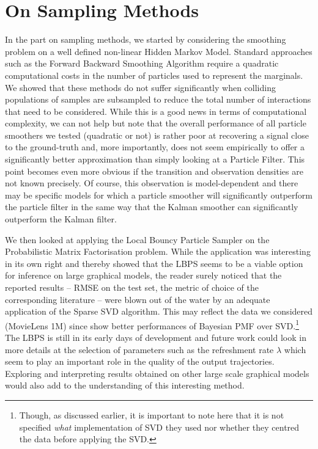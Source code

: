 \section{On Sampling Methods}

In the part on sampling methods, we started by considering the smoothing problem on a well defined non-linear Hidden Markov Model. Standard approaches such as the Forward Backward Smoothing Algorithm require a quadratic computational costs in the number of particles used to represent the marginals. We showed that these methods do not suffer significantly when colliding populations of samples are subsampled to reduce the total number of interactions that need to be considered. While this is a good news in terms of computational complexity, we can not help but note that the overall performance of all particle smoothers we tested (quadratic or not) is rather poor at recovering a signal close to the ground-truth and, more importantly, does not seem empirically to offer a significantly better approximation than simply looking at a Particle Filter. This point becomes even more obvious if the transition and observation densities are not known precisely. Of course, this observation is model-dependent and there may be specific models for which a particle smoother will significantly outperform the particle filter in the same way that the Kalman smoother can significantly outperform the Kalman filter.

We then looked at applying the Local Bouncy Particle Sampler on the Probabilistic Matrix Factorisation problem. While the application was interesting in its own right and thereby showed that the LBPS seems to be a viable option for inference on large graphical models, the reader surely noticed that the reported results -- RMSE on the test set, the metric of choice of the corresponding literature -- were blown out of the water by an adequate application of the Sparse SVD algorithm. This may reflect the data we considered (MovieLens 1M) since \cite{mnih08} show better performances of Bayesian PMF over SVD.\footnote{Though, as discussed earlier, it is important to note here that it is not specified \emph{what} implementation of SVD they used nor whether they centred the data before applying the SVD. } The LBPS is still in its early days of development and future work could look in more details at the selection of parameters such as the refreshment rate $\lambda$ which seem to play an important role in the quality of the output trajectories. Exploring and interpreting results obtained on other large scale graphical models would also add to the understanding of this interesting method.

